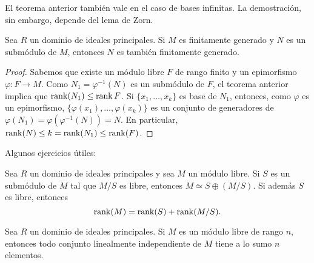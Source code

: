 El teorema anterior también vale en el caso de bases infinitas. La demostración, sin embargo, depende del lema de Zorn.
	



\begin{corollary}
Sea $R$ un dominio de ideales principales. Si $M$ es finitamente generado y $N$ 
es un submódulo de $M$, entonces $N$ es también finitamente generado.  
\end{corollary}

\begin{proof}
Sabemos que existe un módulo libre $F$ de rango finito y un epimorfismo 
$\varphi\colon F\to M$. Como $N_1=\varphi^{-1}(N)$ es un submódulo de $F$, el teorema anterior
implica que 
$\operatorname{rank}(N_1)\leq\operatorname{rank} F$. Si $\{x_1,\dots,x_k\}$ es base de $N_1$, entonces, como $\varphi$ es un epimorfismo, $\{\varphi(x_1),\dots,\varphi(x_k)\}$ es un conjunto de generadores de 
$\varphi(N_1)=\varphi(\varphi^{-1}(N))=N$. En particular, $\operatorname{rank}(N)\leq k=\operatorname{rank}(N_1)\leq\operatorname{rank}(F)$. 
\end{proof}

Algunos ejercicios útiles:

\begin{exercise}
\label{xca:rank}
    Sea $R$ un dominio de ideales principales  
	y sea $M$ un módulo libre. Si 
	$S$ es un submódulo de $M$ tal que $M/S$ es libre, entonces $M\simeq S\oplus (M/S)$. Si además 
	$S$ es libre, entonces 
	\[
	\operatorname{rank}(M)=\operatorname{rank}(S)+\operatorname{rank}(M/S).
	\] 
\end{exercise}

\begin{exercise}
\label{xca:n_elements}
Sea $R$ un dominio de ideales principales. 
Si $M$ es un módulo libre de rango $n$, entonces todo conjunto linealmente independiente de $M$ tiene
a lo sumo $n$ elementos. 
\end{exercise}

